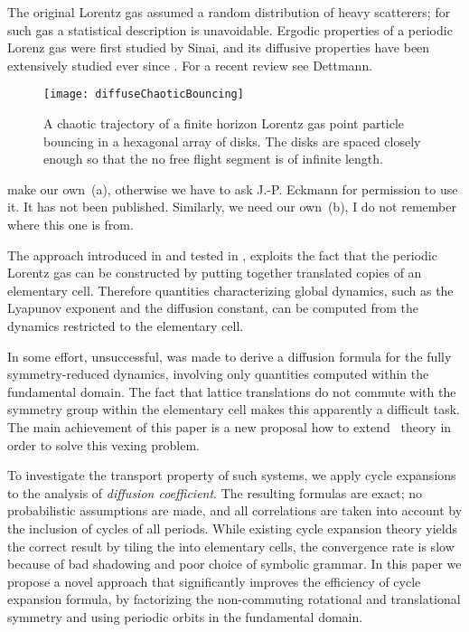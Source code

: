 The original Lorentz gas assumed a random distribution of
heavy scatterers; for such gas a statistical description is unavoidable.
Ergodic properties of a periodic Lorenz gas were first studied by
Sinai, and its diffusive properties have been extensively
studied ever since%
.
For a recent review  see Dettmann.

\begin{figure}[htbp]
	\begin{center}
		\texttt{[image: diffuseChaoticBouncing]}
	\end{center}
	\caption[]{\label{fig-chaoticBouncing}
		A chaotic trajectory of a finite horizon Lorentz gas
		point particle bouncing in a
		hexagonal array of disks. The disks are spaced closely enough
		so that the no free flight segment is of infinite length.
	}
\end{figure}
 {make our own \,(a), otherwise
	we have to ask J.-P. Eckmann for permission to use it. It has not been
	published. Similarly, we need our own \,(b),
	I do not remember where this one is from.}

The approach introduced in  and tested in
, exploits the fact that the periodic Lorentz gas can be
constructed by putting together translated copies of an elementary cell.
Therefore quantities characterizing global dynamics, such as the Lyapunov
exponent and the diffusion constant, can be computed from the dynamics
restricted to the elementary cell.

In  some effort, unsuccessful, was made to derive a diffusion
formula for the fully symmetry-reduced dynamics, involving only
quantities computed within the fundamental domain. The fact that lattice
translations do not commute with the symmetry group within the elementary
cell makes this apparently a difficult task. The main achievement of this paper is
a new proposal how to extend \po\ theory in order to solve this
vexing problem.

To investigate the transport property of such systems, we apply cycle
expansions to the analysis of {\em diffusion coefficient}.
The resulting formulas are exact; no probabilistic assumptions are made,
and all correlations are taken into account by the  inclusion of cycles
of all periods. While existing cycle expansion theory yields the correct
result by tiling the {\statesp} into elementary cells, the convergence
rate is slow because of bad shadowing and poor choice of symbolic
grammar. In this paper we propose a novel approach that
significantly improves the efficiency of cycle expansion formula, by
factorizing the non-commuting rotational and translational symmetry and
using periodic orbits in the fundamental domain.

